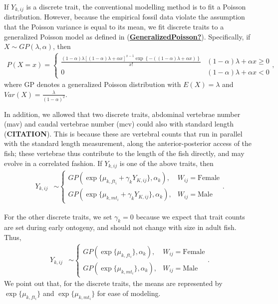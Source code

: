 \documentclass[
  12pt,
]{article}
\begin{document}
If \(Y_{k,ij}\) is a discrete trait, the conventional modelling method
is to fit a Poisson distribution. However, because the empirical fossil
data violate the assumption that the Poisson variance is equal to its
mean, we fit discrete traits to a generalized Poisson model as defined
in
(\protect\hyperlink{ref-GeneralizedPoisson}{\textbf{GeneralizedPoisson?}}).
Specifically, if \(X \sim GP(\lambda,\alpha)\), then \begin{align}
P(X = x) = \left\{\begin{array}{cc} \frac{(1 - \alpha)\lambda[(1 - \alpha)\lambda + \alpha x]^{x - 1} \exp\left\{-((1 - \alpha)\lambda  + \alpha x)\right\}}{x!} & (1 - \alpha)\lambda  + \alpha x \geq 0  \\ 0 & (1 - \alpha)\lambda  + \alpha x < 0 \end{array}\right.,
\label{eq:GP_pmf}
\end{align} where GP denotes a generalized Poisson distribution with
\(E(X) = \lambda\) and \(Var(X) = \frac{\lambda}{(1 - \alpha)^2}\).

In addition, we allowed that two discrete traits, abdominal vertebrae
number (mav) and caudal vertebrae number (mcv) could also with standard
length (\textbf{CITATION}). This is because these are vertebral counts
that run in parallel with the standard length measurement, along the
anterior-posterior access of the fish; these vertebrae thus contribute
to the length of the fish directly, and may evolve in a correlated
fashion. If \(Y_{k,ij}\) is one of the above traits, then \begin{align}
{Y}_{k,ij} & \sim \left\{\begin{array}{ll} GP(\exp\{\mu_{k,ft_i} + \gamma_kY_{K,ij}\},\alpha_k), & W_{ij} = \text{Female} \\ GP(\exp\{\mu_{k,mt_i} + \gamma_kY_{K,ij}\},\alpha_k), & W_{ij} = \text{Male} \end{array}\right..
\label{eq:disc_corr}
\end{align}

For the other discrete traits, we set \(\gamma_k = 0\) because we expect
that trait counts are set during early ontogeny, and should not change
with size in adult fish. Thus, \begin{align}
{Y}_{k,ij} & \sim \left\{\begin{array}{ll} GP(\exp\{\mu_{k,ft_i}\},\alpha_k), & W_{ij} = \text{Female} \\ GP(\exp\{\mu_{k,mt_i}\},\alpha_k), & W_{ij} = \text{Male} \end{array}\right..
\label{eq:disc_ind}
\end{align} We point out that, for the discrete traits, the means are
represented by \(\exp\{\mu_{k,ft_i}\}\) and \(\exp\{\mu_{k,mt_i}\}\) for
ease of modeling.
\end{document}
